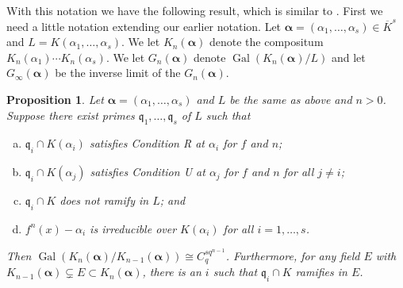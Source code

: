 \documentclass[11pt]{amsart}
\newtheorem{prop}[thm]{Proposition}
\theoremstyle{definition}
\theoremstyle{definition}
\numberwithin{thm}{section}
\numberwithin{equation}{thm}
\newcommand{\fq}{\ensuremath{{\mathfrak{q}}}}
\newcommand{\Kbar}{\ensuremath {\overline K}}
\newcommand{\ba}{{\boldsymbol \alpha}}
\DeclareMathOperator{\Gal}{Gal}
\begin{document}
With this notation we have the following result, which is similar to
\cite[Proposition~6.7]{BT2}.  First we need a little notation
extending our earlier notation.  Let $\ba = (\alpha_1, \dots,
\alpha_s)  \in \Kbar^{s}$ and $L=K(\alpha_1,\dots,\alpha_s)$.
We let $K_n(\ba)$ denote the compositum $K_n(\alpha_1)
\cdots K_n(\alpha_s)$.  We let $G_n(\ba)$ denote $\Gal(K_n(\ba)/L)$
and let $G_\infty(\ba)$ be the inverse limit of the $G_n(\ba)$.

\begin{prop}\label{final Galois}
  Let $\ba = (\alpha_1, \dots, \alpha_s)$ and $L$ be the same as above
  and $n>0$. Suppose there exist primes $\fq_1,\dots,\fq_s$ of $L$ such that
\begin{enumerate}[(a)]
\item $\fq_i \cap K(\alpha_i)$ satisfies Condition R at
$\alpha_i$ for $f$ and $n$;
\item $\fq_i \cap K(\alpha_j)$ satisfies Condition U at
$\alpha_j$ for $f$ and $n$ for all $j \ne i$;
\item $\fq_i \cap K$ does not ramify in $L$; and
\item $f^n(x) - \alpha_i$ is irreducible over $K(\alpha_i)$ for
  all $i = 1, \dots, s$.
\end{enumerate}
Then  $\Gal(K_{n}(\ba)/ K_{n-1}(\ba)) \cong C_q^{s q^{n-1}}$.
Furthermore, for any field $E$ with $K_{n-1}(\ba) \subsetneq E \subset
K_{n}(\ba)$, there is an $i$ such that $\fq_i \cap K$ ramifies in
$E$.   
\end{prop}
\end{document}
